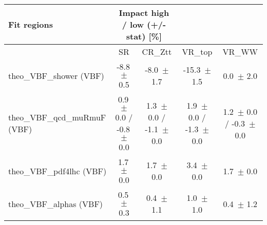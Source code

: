 \begin{tabular}{ l || c  c  c  c }
Fit regions & \multicolumn{2}{||c}{Impact high / low (+/- stat) [\%]} &  & \tabularnewline
\hline
 & SR & CR\_Ztt & VR\_top & VR\_WW \tabularnewline
\hline
theo\_VBF\_shower (VBF) & -8.8\, $\pm$  0.5 & -8.0\, $\pm$  1.7 & -15.3\, $\pm$  1.5 & 0.0\, $\pm$  2.0\tabularnewline
theo\_VBF\_qcd\_muRmuF (VBF) & 0.9\, $\pm$ 0.0 / -0.8\, $\pm$ 0.0 & 1.3\, $\pm$ 0.0 / -1.1\, $\pm$ 0.0 & 1.9\, $\pm$ 0.0 / -1.3\, $\pm$ 0.0 & 1.2\, $\pm$ 0.0 / -0.3\, $\pm$ 0.0\tabularnewline
theo\_VBF\_pdf4lhc (VBF) & 1.7\, $\pm$  0.0 & 1.7\, $\pm$  0.0 & 3.4\, $\pm$  0.0 & 1.7\, $\pm$  0.0\tabularnewline
theo\_VBF\_alphas (VBF) & 0.5\, $\pm$  0.3 & 0.4\, $\pm$  1.1 & 1.0\, $\pm$  1.0 & 0.4\, $\pm$  1.2
\end{tabular}

